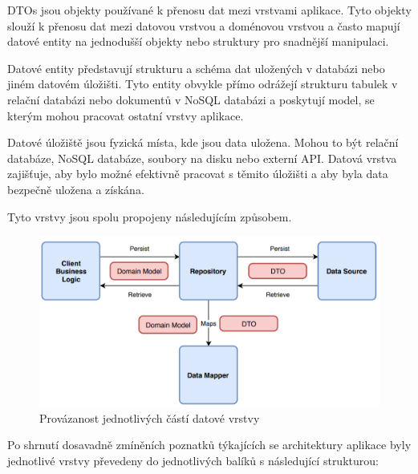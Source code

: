 DTOs jsou objekty používané k přenosu dat mezi vrstvami aplikace. Tyto objekty slouží k přenosu dat mezi datovou vrstvou a doménovou 
vrstvou a často mapují datové entity na jednodušší objekty nebo struktury pro snadnější manipulaci.

Datové entity představují strukturu a schéma dat uložených v databázi nebo jiném datovém úložišti. Tyto entity obvykle přímo odrážejí
strukturu tabulek v relační databázi nebo dokumentů v NoSQL databázi a poskytují model, se kterým mohou pracovat ostatní vrstvy aplikace.

Datové úložiště jsou fyzická místa, kde jsou data uložena. Mohou to být relační databáze, NoSQL databáze, soubory na disku nebo externí API. 
Datová vrstva zajišťuje, aby bylo možné efektivně pracovat s těmito úložišti a aby byla data bezpečně uložena a získána.

\bigskip

Tyto vrstvy jsou spolu propojeny následujícím způsobem.

\begin{figure}[H]
  \centering
  \includegraphics[width=.8\textwidth]{arch_diagram.png}
  \caption{Provázanost jednotlivých částí datové vrstvy}
  \label{fig:arch_diagram}
\end{figure}

\bigskip

Po shrnutí dosavadně zmíněních poznatků týkajících se architektury aplikace byly jednotlivé vrstvy převedeny do jednotlivých balíků s následující
strukturou:

\bigskip





